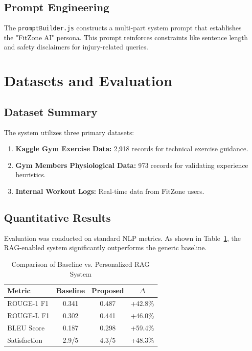 \documentclass[conference]{IEEEtran}
\begin{document}
\subsection{Prompt Engineering}
The \texttt{promptBuilder.js} constructs a multi-part system prompt that establishes the "FitZone AI" persona. This prompt reinforces constraints like sentence length and safety disclaimers for injury-related queries.

\section{Datasets and Evaluation}

\subsection{Dataset Summary}
The system utilizes three primary datasets:
\begin{enumerate}
    \item \textbf{Kaggle Gym Exercise Data:} 2,918 records for technical exercise guidance.
    \item \textbf{Gym Members Physiological Data:} 973 records for validating experience heuristics.
    \item \textbf{Internal Workout Logs:} Real-time data from FitZone users.
\end{enumerate}

\subsection{Quantitative Results}
Evaluation was conducted on standard NLP metrics. As shown in Table~\ref{tab:results}, the RAG-enabled system significantly outperforms the generic baseline.

\begin{table}[htbp]
\caption{Comparison of Baseline vs. Personalized RAG System}
\label{tab:results}
\centering
\begin{tabular}{lccc}
\toprule
\textbf{Metric} & \textbf{Baseline} & \textbf{Proposed} & \textbf{$\Delta$} \\
\midrule
ROUGE-1 F1       & 0.341 & 0.487 & +42.8\% \\
ROUGE-L F1       & 0.302 & 0.441 & +46.0\% \\
BLEU Score       & 0.187 & 0.298 & +59.4\% \\
Satisfaction     & 2.9/5 & 4.3/5 & +48.3\% \\
\bottomrule
\end{tabular}
\end{table}
\end{document}
